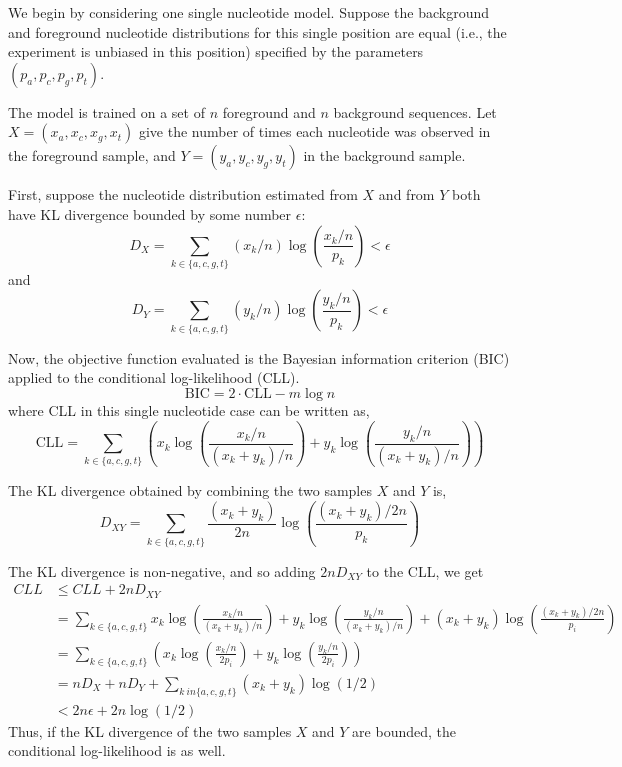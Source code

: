 \documentclass[letterpaper]{article}
\begin{document}
We begin by considering one single nucleotide model. Suppose the background and
foreground nucleotide distributions for this single position are equal (i.e.,
the experiment is unbiased in this position) specified by the parameters $(p_{a}, p_{c},
p_{g}, p_{t})$.

The model is trained on a set of $n$ foreground and $n$ background sequences.
Let $X = (x_{a}, x_{c}, x_{g}, x_{t})$ give the number of times each nucleotide
was observed in the foreground sample, and $Y = (y_{a}, y_{c}, y_{g}, y_{t})$
in the background sample.

First, suppose the nucleotide distribution estimated from $X$ and from $Y$ both
have KL divergence bounded by some number $\epsilon$:
$$ D_{X} = \sum_{k \in \{a, c, g, t\}} (x_k / n) \log \left( \frac{x_k / n}{p_k}
\right) < \epsilon $$
and
$$ D_{Y} = \sum_{k \in \{a, c, g, t\}} (y_k / n) \log \left( \frac{y_k / n}{p_k}
\right) < \epsilon $$

Now, the objective function evaluated is the Bayesian information criterion (BIC)
applied to the conditional log-likelihood (CLL).
$$ \text{BIC} = 2 \cdot \text{CLL} - m \log n $$
where CLL in this single nucleotide case can be written as,
$$ \text{CLL} =
\sum_{k \in \{a, c, g, t\}}
\left(
x_k \log \left( \frac{x_k/n}{(x_k + y_k)/n} \right) +
y_k \log \left( \frac{y_k/n}{(x_k + y_k)/n} \right) \right)$$

The KL divergence obtained by combining the two samples $X$ and $Y$ is,
$$D_{XY} = \sum_{k \in \{a, c, g, t\}}
\frac{(x_k + y_k)}{2n}
\log \left( \frac{(x_k + y_k)/2n}{p_k} \right)$$

The KL divergence is non-negative, and so adding $2n D_{XY}$ to the CLL, we get
\begin{align*}
CLL &\le CLL + 2n D_{XY} \\
&=
\textstyle{
\sum_{k \in \{a, c, g, t\}} 
x_k \log \left( \frac{x_k/n}{(x_k + y_k)/n} \right)
+ y_k \log \left( \frac{y_k/n}{(x_k + y_k)/n} \right)
+ (x_k + y_k) \log \left( \frac{(x_k + y_k)/2n}{p_i} \right)} \\
&=
\textstyle{
\sum_{k \in \{a, c, g, t\}}
\left(
x_k \log \left( \frac{x_k/n}{2 p_i} \right) +
y_k \log \left( \frac{y_k/n}{2 p_i} \right)
\right)} \\
&=
\textstyle{
n D_{X} + n D_{Y} + \sum_{k \ in \{a, c, g, t\}} (x_k + y_k) \log (1/2)
} \\
&< 2n\epsilon + 2n \log (1/2)
\end{align*}
Thus, if the KL divergence of the two samples $X$ and $Y$ are bounded, the
conditional log-likelihood is as well.
\end{document}
